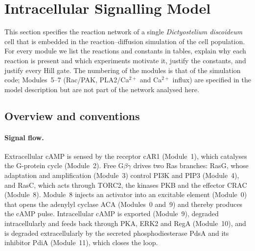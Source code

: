 \section{Intracellular Signalling Model}\label{sec:model}

This section specifies the reaction network of a single \emph{Dictyostelium discoideum} cell that is embedded in the reaction--diffusion simulation of the cell population.
For every module we list the reactions and constants in tables, explain why each reaction is present and which experiments motivate it, justify the constants, and justify every Hill gate.
The numbering of the modules is that of the simulation code; Modules~5--7 (Rac/PAK, PLA2/Ca$^{2+}$ and Ca$^{2+}$ influx) are specified in the model description but are not part of the network analysed here.

\subsection{Overview and conventions}\label{sec:conv}

\paragraph{Signal flow.}
Extracellular cAMP is sensed by the receptor cAR1 (Module~1), which catalyses the G-protein cycle (Module~2).
Free G$\beta\gamma$ drives two Ras branches: RasG, whose adaptation and amplification (Module~3) control PI3K and PIP3 (Module~4), and RasC, which acts through TORC2, the kinases PKB and the effector CRAC (Module~8).
Module~8 injects an activator into an excitable element (Module~0) that opens the adenylyl cyclase ACA (Modules~0 and~9) and thereby produces the cAMP pulse.
Intracellular cAMP is exported (Module~9), degraded intracellularly and feeds back through PKA, ERK2 and RegA (Module~10), and is degraded extracellularly by the secreted phosphodiesterase PdsA and its inhibitor PdiA (Module~11), which closes the loop.

